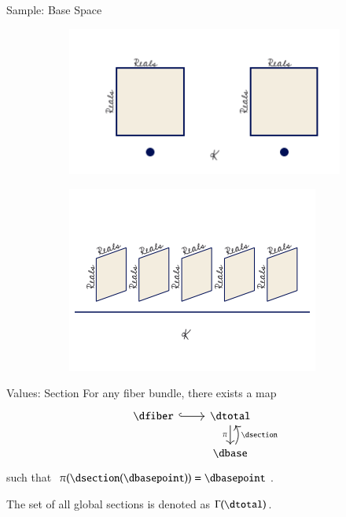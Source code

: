 \documentclass[xcolor={dvipsnames}, handout]{beamer}
\begin{document}
\begin{frame}{Sample: Base Space}
    \begin{figure}[H]
        \begin{subfigure}{.4\textwidth}
            \includegraphics[width=\textwidth]{figures/math/temp_1k.png}
            \label{fig:base_example_discrete}
        \end{subfigure}
        \begin{subfigure}{.4\textwidth}
            \includegraphics[width=\textwidth]{figures/math/temp_2f.png}
            \label{fig:base_example_continuous}
        \end{subfigure}
        \label{fig:base_example}
    \end{figure}
\end{frame}

\begin{frame}{Values: Section}
    For any fiber bundle, there exists a map
    \begin{equation}
        \begin{tikzcd}[ampersand replacement=\&]
            \dfiber \arrow[r, hook] \& \dtotal \arrow[d, "\pi"'] \\
                              \& \dbase \arrow[u, "\dsection"', bend right]
        \end{tikzcd}
    \end{equation}
     such that $\pi(\dsection(\dbasepoint)) = \dbasepoint$. 
     
     The set of all global sections is denoted as $\Gamma(\dtotal)$.
\end{frame}
\end{document}
